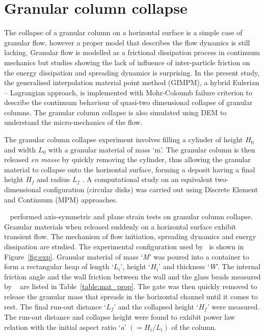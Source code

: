 \section{Granular column collapse}

The collapse of a granular column on a horizontal surface is a simple case of 
granular flow, however a proper model that describes the flow dynamics is still
lacking. Granular flow is modelled as a frictional dissipation process in 
continuum mechanics but studies showing the lack of influence of inter-particle 
friction on the energy dissipation and spreading dynamics is surprising. 
In the present study, the generalised interpolation material point method 
(GIMPM), a hybrid Eulerian -- Lagrangian approach, is implemented with 
Mohr-Coloumb failure criterion to describe the continuum behaviour of quasi-two 
dimensional collapse of granular columns. The granular column collapse is also 
simulated using DEM to understand the micro-mechanics of the flow.

The granular column collapse experiment involves filling a cylinder of height 
$H_0$ and width $L_0$ with a granular material of mass `m'. The granular column 
is then released \textit{en masse} by quickly removing the cylinder, thus 
allowing the granular material to collapse onto the horizontal surface, forming 
a deposit having a final height $H_f$ and radius $L_f$ . A computational study 
on an equivalent two-dimensional configuration (circular disks) was carried out 
using Discrete Element and Continuum (MPM) approaches.

~\citet{Lajeunesse2004} performed axis-symmetric and plane strain tests on 
granular column collapse. Granular materials when released suddenly on a 
horizontal surface exhibit transient flow. The mechanism of flow initiation, 
spreading dynamics and energy dissipation are studied. The experimental 
configuration used by~\citet{Lajeunesse2004} is shown in Figure~\ref{fig:exp}. 
Granular material of mass `\textit{M}' was poured into a container to form a 
rectangular heap of length `${L}_{\textit{i}}$', height `${H}_{\textit{i}}$' 
and thickness `\textit{W}'. The internal friction angle and the wall friction 
between the wall and the glass beads measured by ~\citet{Lajeunesse2004} are 
listed in Table~\ref{table:mat_prop}. The gate was then quickly removed to 
release the granular mass that spreads in the horizontal channel until it comes 
to rest. The final run-out distance `${L}_{\textit{f}}$' and the collapsed 
height `$H_{\textit{f}}$' were measured. The run-out distance and collapse 
height were found to exhibit power law relation with the initial aspect ratio 
`\textit{a}' $(=H_{\textit{i}}/L_{\textit{i}})$ of the column. 

